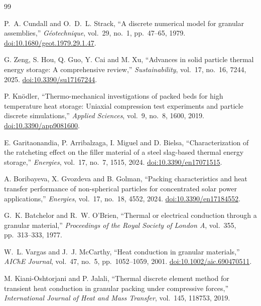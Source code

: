 \documentclass[12pt,a4paper]{article}
\begin{document}
	\begin{thebibliography}{99}

		P.~A. Cundall and O.~D.~L. Strack,
		``A discrete numerical model for granular assemblies,''
		\emph{G\'{e}otechnique}, vol.~29, no.~1, pp.~47--65, 1979.
		\href{https://doi.org/10.1680/geot.1979.29.1.47}
		{doi:10.1680/geot.1979.29.1.47}.

		G. Zeng, S. Hou, Q. Guo, Y. Cai and M. Xu,
		``Advances in solid particle thermal energy storage: A comprehensive review,''
		\emph{Sustainability}, vol.~17, no.~16, 7244, 2025.
		\href{https://doi.org/10.3390/su17167244}
		{doi:10.3390/su17167244}.

		P. Kn\"odler,
		``Thermo-mechanical investigations of packed beds for high temperature heat
		storage: Uniaxial compression test experiments and particle discrete
		simulations,''
		\emph{Applied Sciences}, vol.~9, no.~8, 1600, 2019.
		\href{https://doi.org/10.3390/app9081600}
		{doi:10.3390/app9081600}.

		E. Garitaonandia, P. Arribalzaga, I. Miguel and D. Bielsa,
		``Characterization of the ratcheting effect on the filler material of a steel
		slag-based thermal energy storage,''
		\emph{Energies}, vol.~17, no.~7, 1515, 2024.
		\href{https://doi.org/10.3390/en17071515}
		{doi:10.3390/en17071515}.

		A. Boribayeva, X. Gvozdeva and B. Golman,
		``Packing characteristics and heat transfer performance of non-spherical
		particles for concentrated solar power applications,''
		\emph{Energies}, vol.~17, no.~18, 4552, 2024.
		\href{https://doi.org/10.3390/en17184552}
		{doi:10.3390/en17184552}.
		
		G.~K. Batchelor and R.~W. O'Brien,
		``Thermal or electrical conduction through a granular material,''
		\emph{Proceedings of the Royal Society of London A}, vol.~355,
		pp.~313--333, 1977.
		
		W.~L. Vargas and J.~J. McCarthy,
		``Heat conduction in granular materials,''
		\emph{AIChE Journal}, vol.~47, no.~5, pp.~1052--1059, 2001.
		\href{https://doi.org/10.1002/aic.690470511}{doi:10.1002/aic.690470511}.
		
		M. Kiani-Oshtorjani and P. Jalali,
		``Thermal discrete element method for transient heat conduction in granular
		packing under compressive forces,''
		\emph{International Journal of Heat and Mass Transfer}, vol.~145,
		118753, 2019.
		

\end{thebibliography}
\end{document}
